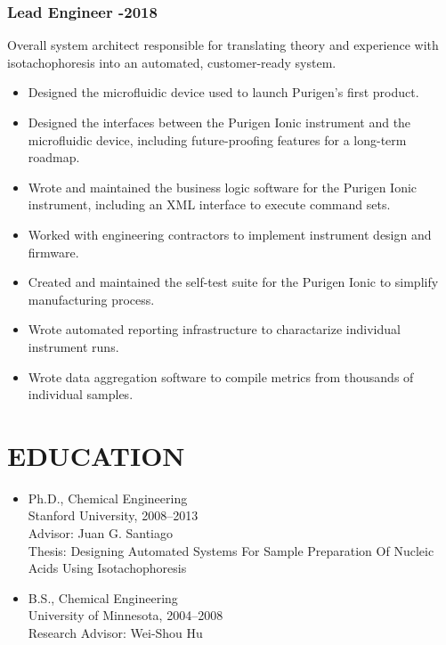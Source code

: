 \documentclass{res}
\begin{document}
\begin{resume}
\pagebreak

    \subsubsection{Lead Engineer -2018}
      \vspace{-0.1in}
      Overall system architect responsible for translating theory and experience with isotachophoresis
      into an automated, customer-ready system.
      \vspace{0.1in}
      \begin{itemize}
        \item Designed the microfluidic device used to launch Purigen's first product.
        \item Designed the interfaces between the Purigen Ionic instrument and the microfluidic device, including future-proofing features for a long-term roadmap.
        \item Wrote and maintained the business logic software for the Purigen Ionic instrument, including an XML interface to execute command sets.
        \item Worked with engineering contractors to implement instrument design and firmware.
        \item Created and maintained the self-test suite for the Purigen Ionic to simplify manufacturing process.
        \item Wrote automated reporting infrastructure to charactarize individual instrument runs.
        \item Wrote data aggregation software to compile metrics from thousands of individual samples.
      \end{itemize}



\section{EDUCATION}
    \begin{itemize}
  		\item{Ph.D., Chemical Engineering}\\
		  Stanford University, 2008--2013 \\
  		Advisor: Juan G. Santiago\\
      Thesis: Designing Automated Systems For Sample Preparation Of Nucleic Acids Using Isotachophoresis
  	  \item{B.S., Chemical Engineering}\\
		  University of Minnesota, 2004--2008 \\
      Research Advisor: Wei-Shou Hu
    \end{itemize}


\end{resume}
\end{document}
